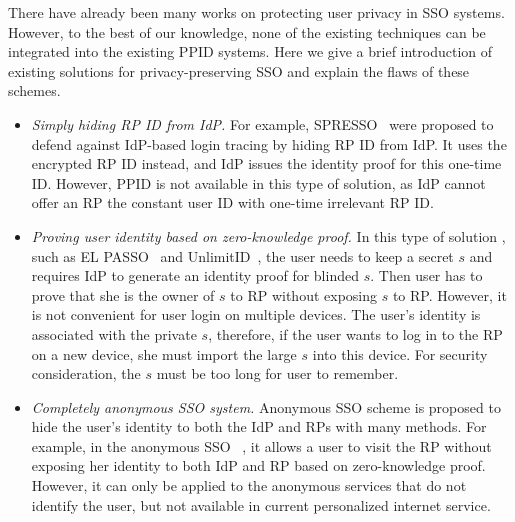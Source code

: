 There have already been many works on protecting user privacy in SSO systems. 
However, to the best of our knowledge, none of the existing techniques can be integrated into the existing PPID systems. 
Here we give a brief introduction of existing solutions for privacy-preserving SSO and explain the flaws of these schemes. 
\begin{itemize}
\item {\em Simply hiding RP ID from IdP. }For example, SPRESSO~\cite{SPRESSO} were proposed to defend against IdP-based login tracing by hiding RP ID from IdP. It uses the encrypted RP ID instead, and IdP issues the identity proof for this one-time ID. However, PPID is not available in this type of solution, as IdP cannot offer an RP the constant user ID with one-time irrelevant RP ID.
\item {\em Proving user identity based on zero-knowledge proof. }In this type of solution , such as EL PASSO~\cite{ZhangKSZR21} and UnlimitID~\cite{IsaakidisHD16}, the user needs to keep a secret $s$ and requires IdP to generate an identity proof for blinded $s$. Then user has to prove that she is the owner of $s$ to RP without exposing $s$ to RP. However, it is not convenient for user login on multiple devices. The user's identity is associated with the private $s$, therefore, if the user wants to log in to the RP on a new device, she must import the large $s$ into this device. For security consideration, the $s$ must be too long for user to remember. 
\item {\em Completely anonymous SSO system. }Anonymous SSO scheme is proposed to hide the user's identity to both the IdP and RPs with many methods. For example, in the anonymous SSO ~\cite{HanCSTW18}, it allows a user to visit the RP without exposing her identity to both IdP and RP based on zero-knowledge proof. However, it can only be applied to the anonymous services that do not identify the user, but not available in current personalized internet service.
\end{itemize}



